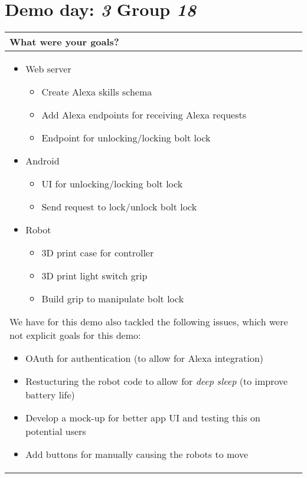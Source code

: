 \documentclass[a4paper]{article}
\newcommand{\colWidth}{141mm}
\begin{document}
 
\section*{Demo day: \textit{3} Group \textit{18}}


\begin{center}
\begin{tabular}{|p{\colWidth}|}
	\hline
	\cellcolor{blue!25}\large
	\textbf{What were your goals?}
	\\ \hline
	
	\begin{itemize}
		\item Web server 
		\begin{itemize}
			\item Create Alexa skills schema
			\item Add Alexa endpoints for receiving Alexa requests
			\item Endpoint for unlocking/locking bolt lock
		\end{itemize}
		\item Android
		\begin{itemize}
			\item UI for unlocking/locking bolt lock
			\item Send request to lock/unlock bolt lock
		\end{itemize}
		\item Robot
		\begin{itemize}
			\item 3D print case for controller
			\item 3D print light switch grip
			\item Build grip to manipulate bolt lock
		\end{itemize}
	\end{itemize}

	We have for this demo also tackled the following issues, which were not explicit goals for this demo:
	\begin{itemize}
		\item OAuth for authentication (to allow for Alexa integration)
		\item Restucturing the robot code to allow for \textit{deep sleep} (to improve battery life)
		\item Develop a mock-up for better app UI and testing this on potential users
		\item Add buttons for manually causing the robots to move
	\end{itemize}
	\\ \hline
\end{tabular}
\vskip 5mm


\end{center}
\end{document}
